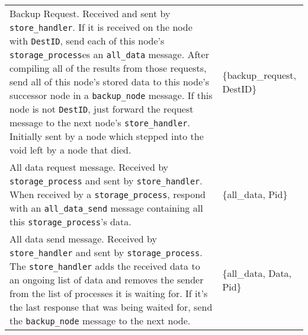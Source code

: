 \documentclass[12pt,letterpaper]{article}
\renewcommand{\tt}[1]{\texttt{#1}}
\newcommand{\sh}{\tt{store\_handler}}
\renewcommand{\sp}{\tt{storage\_process}}
\begin{document}
\begin{longtable}{p{4.5in}T}
Backup Request.  Received and sent by \sh.  If it is received on the node with \tt{DestID}, send each of this node's \sp es an \tt{all\_data} message.  After compiling all of the results from those requests, send all of this node's stored data to this node's successor node in a \tt{backup\_node} message.  If this node is not \tt{DestID}, just forward the request message to the next node's \sh. Initially sent by a node which stepped into the void left by a node that died.  & 
\{backup\_request, DestID\} \\

All data request message.  Received by \sp{} and sent by \sh.  When received by a \sp, respond with an \tt{all\_data\_send} message containing all this \sp's data.  & 
\{all\_data, Pid\} \\

All data send message.  Received by \sh{} and sent by \sp.  The \sh{} adds the received data to an ongoing list of data and removes the sender from the list of processes it is waiting for. If it's the last response that was being waited for, send the \tt{backup\_node} message to the next node. & 
\{all\_data, Data, Pid\}




\end{longtable}
\end{document}
